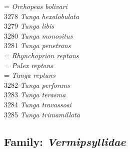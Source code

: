 \documentclass[
]{article}
\begin{document}
= \emph{Orchopeas bolivari}\\
3278 \emph{Tunga hexalobulata}\\
3279 \emph{Tunga libis}\\
3280 \emph{Tunga monositus}\\
3281 \emph{Tunga penetrans}\\
= \emph{Rhynchoprion reptans}\\
= \emph{Pulex reptans}\\
= \emph{Tunga reptans}\\
3282 \emph{Tunga perforans}\\
3283 \emph{Tunga terasma}\\
3284 \emph{Tunga travassosi}\\
3285 \emph{Tunga trimamillata}

\hypertarget{family-vermipsyllidae}{%
\subsection{\texorpdfstring{Family:
\emph{Vermipsyllidae}}{Family: Vermipsyllidae}}\label{family-vermipsyllidae}}
\end{document}
